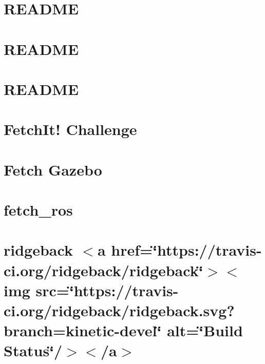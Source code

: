 \let\mypdfximage\pdfximage\def\pdfximage{\immediate\mypdfximage}\documentclass[twoside]{book}
\newcommand{\+}{\discretionary{\mbox{\scriptsize$\hookleftarrow$}}{}{}}
\begin{document}
\chapter{R\+E\+A\+D\+ME}
\label{md_smacc_sm_reference_library_sm_three_some_README}

\chapter{R\+E\+A\+D\+ME}
\label{md_smacc_sm_reference_library_sm_update_loop_README}

\chapter{R\+E\+A\+D\+ME}
\label{md_smacc_sm_reference_library_sm_viewer_sim_README}

\chapter{Fetch\+It! Challenge}
\label{md_submodules_fetch_gazebo_fetchit_challenge_README}

\chapter{Fetch Gazebo}
\label{md_submodules_fetch_gazebo_README}

\chapter{fetch\+\_\+ros}
\label{md_submodules_fetch_ros_README}

\chapter{ridgeback $<$a href=\char`\"{}https\+://travis-\/ci.\+org/ridgeback/ridgeback\char`\"{}$>$$<$img src=\char`\"{}https\+://travis-\/ci.\+org/ridgeback/ridgeback.\+svg?branch=kinetic-\/devel\char`\"{} alt=\char`\"{}\+Build Status\char`\"{}/$>$$<$/a$>$}
\label{md_submodules_ridgeback_README}

\end{document}
